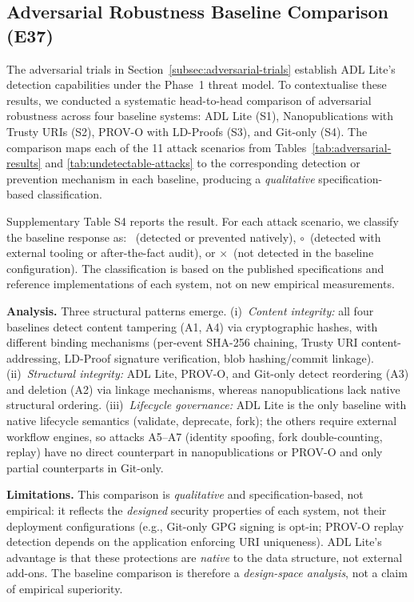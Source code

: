 \subsection{Adversarial Robustness Baseline Comparison (E37)}\label{subsec:e37-adversarial-baseline}

The adversarial trials in Section~\ref{subsec:adversarial-trials} establish ADL Lite's detection capabilities under the Phase~1 threat model. To contextualise these results, we conducted a systematic head-to-head comparison of adversarial robustness across four baseline systems: ADL Lite (S1), Nanopublications with Trusty URIs (S2), PROV-O with LD-Proofs (S3), and Git-only (S4). The comparison maps each of the 11 attack scenarios from Tables~\ref{tab:adversarial-results} and \ref{tab:undetectable-attacks} to the corresponding detection or prevention mechanism in each baseline, producing a \emph{qualitative} specification-based classification.

Supplementary Table S4 reports the result. For each attack scenario, we classify the baseline response as: \checkmark\ (detected or prevented natively), $\circ$\ (detected with external tooling or after-the-fact audit), or $\times$\ (not detected in the baseline configuration). The classification is based on the published specifications and reference implementations of each system, not on new empirical measurements.

\textbf{Analysis.} Three structural patterns emerge. (i)~\emph{Content integrity:} all four baselines detect content tampering (A1, A4) via cryptographic hashes, with different binding mechanisms (per-event SHA-256 chaining, Trusty URI content-addressing, LD-Proof signature verification, blob hashing/commit linkage). (ii)~\emph{Structural integrity:} ADL Lite, PROV-O, and Git-only detect reordering (A3) and deletion (A2) via linkage mechanisms, whereas nanopublications lack native structural ordering. (iii)~\emph{Lifecycle governance:} ADL Lite is the only baseline with native lifecycle semantics (validate, deprecate, fork); the others require external workflow engines, so attacks A5--A7 (identity spoofing, fork double-counting, replay) have no direct counterpart in nanopublications or PROV-O and only partial counterparts in Git-only.

\textbf{Limitations.} This comparison is \emph{qualitative} and specification-based, not empirical: it reflects the \emph{designed} security properties of each system, not their deployment configurations (e.g., Git-only GPG signing is opt-in; PROV-O replay detection depends on the application enforcing URI uniqueness). ADL Lite's advantage is that these protections are \emph{native} to the data structure, not external add-ons. The baseline comparison is therefore a \emph{design-space analysis}, not a claim of empirical superiority.

